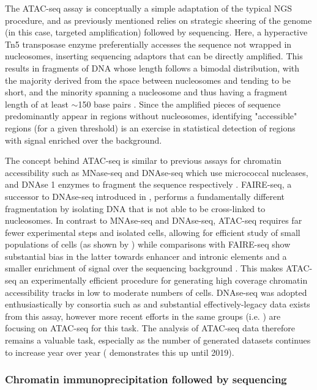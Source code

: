 The ATAC-seq assay is conceptually a simple adaptation of the typical NGS procedure, and as previously mentioned relies on strategic sheering of the genome (in this case, targeted amplification) followed by sequencing. Here, a hyperactive Tn5 transposase enzyme preferentially accesses the sequence not wrapped in nucleosomes, inserting sequencing adaptors that can be directly amplified. This results in fragments of DNA whose length follows a bimodal distribution, with the majority derived from the space between nucleosomes and tending to be short, and the minority spanning a nucleosome and thus having a fragment length of at least $\sim$150 base pairs \cite{Yan2020a}. Since the amplified pieces of sequence predominantly appear in regions without nucleosomes, identifying "accessible" regions (for a given threshold) is an exercise in statistical detection of regions with signal enriched over the background.

The concept behind ATAC-seq is similar to previous assays for chromatin accessibility such as MNase-seq and DNAse-seq which use micrococcal nucleases, and DNAse 1 enzymes to fragment the sequence respectively \cite{Bell2011a}. FAIRE-seq, a successor to DNAse-seq introduced in \textcite{Giresi2007}, performs a fundamentally different fragmentation by isolating DNA that is not able to be cross-linked to nucleosomes. In contrast to MNAse-seq and DNAse-seq, ATAC-seq requires far fewer experimental steps and isolated cells, allowing for efficient study of small populations of cells (as shown by \textcite{Buenrostro2015a}) while comparisons with FAIRE-seq show substantial bias in the latter towards enhancer and intronic elements and a smaller enrichment of signal over the sequencing background \cite{Tsompana2014}. This makes ATAC-seq an experimentally efficient procedure for generating high coverage chromatin accessibility tracks in low to moderate numbers of cells. DNAse-seq was adopted enthusiastically by consortia such as \textcite{ENCODEProjectConsortium2012} and substantial effectively-legacy data exists from this assay, however more recent efforts in the same groups (i.e. \textcite{Moore2020}) are focusing on ATAC-seq for this task. The analysis of ATAC-seq data therefore remains a valuable task, especially as the number of generated datasets continues to increase year over year (\textcite{Yan2020a} demonstrates this up until 2019).

\subsubsection{Chromatin immunoprecipitation followed by sequencing} \label{intro:chip}

